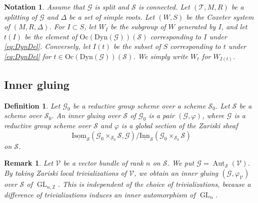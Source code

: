 \documentclass[12pt,a4paper]{article}
\newtheorem{defn}[thm]{Definition}
\newtheorem{rem}[thm]{Remark}
\newtheorem{notn}[thm]{Notation}
\DeclareMathOperator{\Aut}{Aut}
\DeclareMathOperator{\GL}{GL}
\newcommand{\bZ}{\mathbb{Z}}
\newcommand{\sG}{\mathscr{G}}
\newcommand{\sS}{\mathscr{S}}
\newcommand{\sT}{\mathscr{T}}
\newcommand{\sV}{\mathscr{V}}
\begin{document}
\begin{notn}
Assume that $\sG$ is split and $\sS$ is connected. 
Let $(\sT,M,R)$ be a splitting of $\sG$ 
and $\Delta$ be a set of simple roots. 
Let $(W,S)$ be the Coxeter system of $(M,R,\Delta)$. 
For $I \subset S$, let 
$W_I$ be the subgroup of $W$ generated by $I$, 
and 
let $t(I)$ be the element of 
$\mathrm{Oc}(\mathrm{Dyn}(\sG))(\sS)$ 
corresponding to $I$ under \eqref{eq:DynDel}. 
Conversely, 
let $I(t)$ be the subset of $S$ 
corresponding to $t$ under \eqref{eq:DynDel} 
for $t \in \mathrm{Oc}(\mathrm{Dyn}(\sG))(\sS)$. 
We simply write 
$W_t$ for $W_{I(t)}$. 
\end{notn}


\subsection{Inner gluing}
\begin{defn}
Let $\sG_0$ be a reductive group scheme over a scheme $\sS_0$. 
Let $\sS$ be a scheme over $\sS_0$. 
An inner gluing over $\sS$ of $\sG_0$ is 
a pair $(\sG , \varphi)$, where $\sG$ is a reductive group scheme over $\sS$ and 
$\varphi$ is a global section of the Zariski sheaf 
\[
 \underline{\mathrm{Isom}}_{\sS}(\sG_0 \times_{\sS_0} \sS,\sG )/ 
 \underline{\mathrm{Inn}}_{\sS}(\sG_0 \times_{\sS_0} \sS) 
\]
on $\sS$. 
\end{defn}

\begin{rem}\label{rem:vecig}
Let $\sV$ be a vector bundle of rank $n$ on $\sS$. 
We put $\sG=\Aut_{\sS} (\sV)$. 
By taking Zariski local trivializations of 
$\sV$, we obtain an inner gluing $(\sG,\varphi_{\sV})$ over $\sS$ of $\GL_{n,\bZ}$. This is independent of the choice of trivializations, because a difference of trivializations induces an inner automorphism of $\GL_n$.  
\end{rem}
\end{document}
